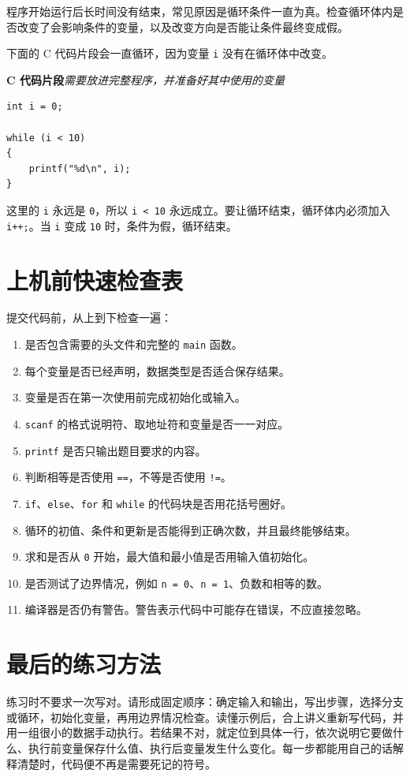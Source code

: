 \documentclass[UTF8,zihao=-4,fontset=windows]{ctexart}
\newcommand{\cfragmentlabel}{\noindent\textbf{C 代码片段}\quad\textit{需要放进完整程序，并准备好其中使用的变量}\par\nopagebreak}
\begin{document}
程序开始运行后长时间没有结束，常见原因是循环条件一直为真。检查循环体内是否改变了会影响条件的变量，以及改变方向是否能让条件最终变成假。

下面的 C 代码片段会一直循环，因为变量 \verb|i| 没有在循环体中改变。

\cfragmentlabel
\begin{lstlisting}[style=cstyle]
int i = 0;

while (i < 10)
{
    printf("%d\n", i);
}
\end{lstlisting}

这里的 \verb|i| 永远是 \verb|0|，所以 \verb|i < 10| 永远成立。要让循环结束，循环体内必须加入 \verb|i++;|。当 \verb|i| 变成 \verb|10| 时，条件为假，循环结束。

\section{上机前快速检查表}

提交代码前，从上到下检查一遍：
\begin{enumerate}
  \item 是否包含需要的头文件和完整的 \verb|main| 函数。
  \item 每个变量是否已经声明，数据类型是否适合保存结果。
  \item 变量是否在第一次使用前完成初始化或输入。
  \item \verb|scanf| 的格式说明符、取地址符和变量是否一一对应。
  \item \verb|printf| 是否只输出题目要求的内容。
  \item 判断相等是否使用 \verb|==|，不等是否使用 \verb|!=|。
  \item \verb|if|、\verb|else|、\verb|for| 和 \verb|while| 的代码块是否用花括号圈好。
  \item 循环的初值、条件和更新是否能得到正确次数，并且最终能够结束。
  \item 求和是否从 \verb|0| 开始，最大值和最小值是否用输入值初始化。
  \item 是否测试了边界情况，例如 \verb|n = 0|、\verb|n = 1|、负数和相等的数。
  \item 编译器是否仍有警告。警告表示代码中可能存在错误，不应直接忽略。
\end{enumerate}

\section*{最后的练习方法}

练习时不要求一次写对。请形成固定顺序：确定输入和输出，写出步骤，选择分支或循环，初始化变量，再用边界情况检查。读懂示例后，合上讲义重新写代码，并用一组很小的数据手动执行。若结果不对，就定位到具体一行，依次说明它要做什么、执行前变量保存什么值、执行后变量发生什么变化。每一步都能用自己的话解释清楚时，代码便不再是需要死记的符号。
\end{document}
